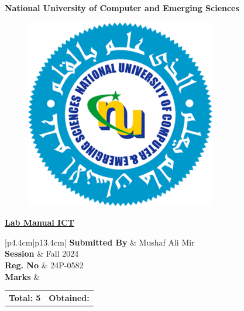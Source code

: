 \documentclass[a4paper,9pt]{article}
\begin{document}
	
	\begin{titlepage}
		\centering
		{\Huge\bfseries National University of Computer and
			Emerging Sciences\par}
		\vspace*{1cm}
		\begin{figure}[H]
			\centering
			\includegraphics[width=0.62\linewidth]{fastlogo.png}
			\label{fig:enter-label}
		\end{figure}
		\vspace{1.6cm}
		{\Huge\bfseries\underline{Lab Manual ICT}\par}
		\vspace{1.3cm}
		
		\begin{table}[H]
			{\LARGE
				\hspace*{-1.3cm}
				\begin{tabular}{|p{4.4cm}|p{13.4cm}|} %
					\hline
					\textbf{Submitted By} & Mushaf Ali Mir \\ \hline
					\textbf{Session}      & Fall 2024 \\ \hline
					\textbf{Reg. No}      & 24P-0582 \\ \hline
					\textbf{Marks}        & \begin{tabular}[t]{@{}p{6cm}|p{4cm}@{}} %
						\textbf{Total: 5} & \textbf{Obtained:} \\
					\end{tabular} \\ \hline
				\end{tabular}
			}
			
		\end{table}
		
	\end{titlepage}
	
\end{document}
